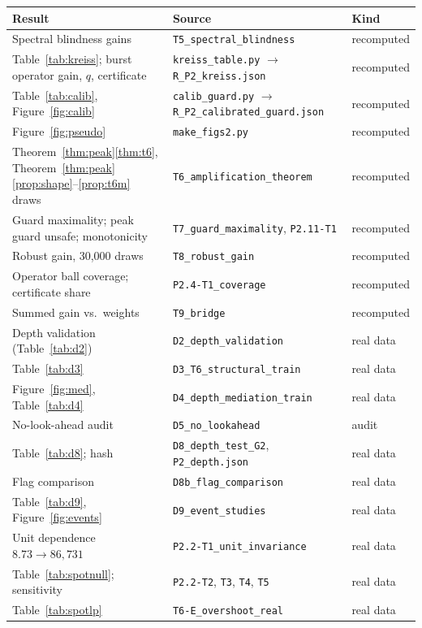 \begin{longtable}{p{}p{}p{}}
\toprule
Result & Source & Kind\\
\midrule
\endhead
Spectral blindness gains & \texttt{T5\_spectral\_blindness} & recomputed\\
Table~\ref{tab:kreiss}; burst operator gain, $q$, certificate & \texttt{kreiss\_table.py} $\to$ \texttt{R\_P2\_kreiss.json} & recomputed\\
Table~\ref{tab:calib}, Figure~\ref{fig:calib} & \texttt{calib\_guard.py} $\to$ \texttt{R\_P2\_calibrated\_guard.json} & recomputed\\
Figure~\ref{fig:pseudo} & \texttt{make\_figs2.py} & recomputed\\
Theorem~\ref{thm:peak}\ref{thm:t6}, Theorem~\ref{thm:peak}\ref{prop:shape}--\ref{prop:t6m} draws & \texttt{T6\_amplification\_theorem} & recomputed\\
Guard maximality; peak guard unsafe; monotonicity & \texttt{T7\_guard\_maximality}, \texttt{P2.11-T1} & recomputed\\
Robust gain, 30,000 draws & \texttt{T8\_robust\_gain} & recomputed\\
Operator ball coverage; certificate share & \texttt{P2.4-T1\_coverage} & recomputed\\
Summed gain vs.\ weights & \texttt{T9\_bridge} & recomputed\\
Depth validation (Table~\ref{tab:d2}) & \texttt{D2\_depth\_validation} & real data\\
Table~\ref{tab:d3} & \texttt{D3\_T6\_structural\_train} & real data\\
Figure~\ref{fig:med}, Table~\ref{tab:d4} & \texttt{D4\_depth\_mediation\_train} & real data\\
No-look-ahead audit & \texttt{D5\_no\_lookahead} & audit\\
Table~\ref{tab:d8}; hash & \texttt{D8\_depth\_test\_G2}, \texttt{P2\_depth.json} & real data\\
Flag comparison & \texttt{D8b\_flag\_comparison} & real data\\
Table~\ref{tab:d9}, Figure~\ref{fig:events} & \texttt{D9\_event\_studies} & real data\\
Unit dependence $8.73\to86{,}731$ & \texttt{P2.2-T1\_unit\_invariance} & real data\\
Table~\ref{tab:spotnull}; sensitivity & \texttt{P2.2-T2}, \texttt{T3}, \texttt{T4}, \texttt{T5} & real data\\
Table~\ref{tab:spotlp} & \texttt{T6-E\_overshoot\_real} & real data\\

\end{longtable}

